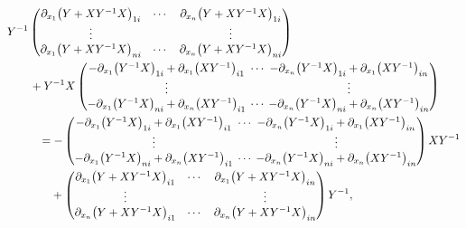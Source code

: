 \documentclass[10pt,a4paper]{amsart}
\numberwithin{equation}{section}
\begin{document}
\begin{align}
&Y^{-1}
\begin{pmatrix}
\partial_{x_1}\bigl(Y+XY^{-1}X\bigr)_{1i} & \cdots & \partial_{x_n}\bigl(Y+XY^{-1}X\bigr)_{1i} \\
\vdots & & \vdots \\
\partial_{x_1}\bigl(Y+XY^{-1}X\bigr)_{ni} & \cdots & \partial_{x_n}\bigl(Y+XY^{-1}X\bigr)_{ni}
\end{pmatrix}\nonumber \\
&\qquad+Y^{-1}X
\begin{pmatrix}
-\partial_{x_1}\bigl(Y^{-1}X\bigr)_{1i}+\partial_{x_1}\bigl(XY^{-1}\bigr)_{i1} & {\hspace*{-3mm}}\cdots{\hspace*{-3mm}} & -\partial_{x_n}\bigl(Y^{-1}X\bigr)_{1i}+\partial_{x_1}\bigl(XY^{-1}\bigr)_{in} \\
\vdots & & \vdots \\
-\partial_{x_1}\bigl(Y^{-1}X\bigr)_{ni}+\partial_{x_n}\bigl(XY^{-1}\bigr)_{i1} &{\hspace*{-3mm}} \cdots {\hspace*{-3mm}}& -\partial_{x_n}\bigl(Y^{-1}X\bigr)_{ni}+\partial_{x_n}\bigl(XY^{-1}\bigr)_{in}
\end{pmatrix}\nonumber \\
&\phantom{\qquad+}{}=-
\begin{pmatrix}
-\partial_{x_1}\bigl(Y^{-1}X\bigr)_{1i}+\partial_{x_1}\bigl(XY^{-1}\bigr)_{i1} &{\hspace*{-3mm}} \cdots {\hspace*{-3mm}}& -\partial_{x_n}\bigl(Y^{-1}X\bigr)_{1i}+\partial_{x_1}\bigl(XY^{-1}\bigr)_{in} \\
\vdots & & \vdots \\
-\partial_{x_1}\bigl(Y^{-1}X\bigr)_{ni}+\partial_{x_n}\bigl(XY^{-1}\bigr)_{i1} & {\hspace*{-3mm}}\cdots{\hspace*{-3mm}} & -\partial_{x_n}\bigl(Y^{-1}X\bigr)_{ni}+\partial_{x_n}\bigl(XY^{-1}\bigr)_{in}
\end{pmatrix}XY^{-1}\nonumber \\
&\phantom{\qquad+=}{}+
\begin{pmatrix}
\partial_{x_1}\bigl(Y+XY^{-1}X\bigr)_{i1} & \cdots & \partial_{x_1}\bigl(Y+XY^{-1}X\bigr)_{in} \\
\vdots & & \vdots \\
\partial_{x_n}\bigl(Y+XY^{-1}X\bigr)_{i1} & \cdots & \partial_{x_n}\bigl(Y+XY^{-1}X\bigr)_{in}
\end{pmatrix}
Y^{-1},\label{K6}

\end{align}
\end{document}
